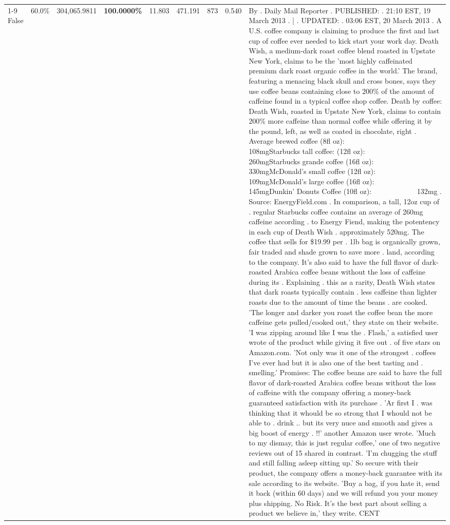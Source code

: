 \begin{table}[H]
{\begin{tabular}{lllrlllll}
\cline{1-9}
False & 60.0\% & 304,065.9811 & \bfseries \color{red} 100.0000\% & 11.803 & 471.191 & 873 & 0.540 & By . Daily Mail Reporter . PUBLISHED: . 21:10 EST, 19 March 2013 . | . UPDATED: . 03:06 EST, 20 March 2013 . A U.S. coffee company is claiming to produce the first and last cup of coffee ever needed to kick start your work day. Death Wish, a medium-dark roast coffee blend roasted in Upstate New York, claims to be the 'most highly caffeinated premium dark roast organic coffee in the world.' The brand, featuring a menacing black skull and cross bones, says they use coffee beans containing close to 200\% of the amount of caffeine found in a typical coffee shop coffee. Death by coffee: Death Wish, roasted in Upstate New York, claims to contain 200\% more caffeine than normal coffee while offering it by the pound, left, as well as coated in chocolate, right . Average brewed coffee (8fl oz):              108mgStarbucks tall coffee: (12fl oz):                260mgStarbucks grande coffee (16fl oz):         330mgMcDonald's small coffee (12fl oz):           109mgMcDonald's large coffee (16fl oz):           145mgDunkin' Donuts Coffee (10fl oz):             132mg . Source: EnergyField.com . In comparison, a tall, 12oz cup of . regular Starbucks coffee contains an average of 260mg caffeine according . to Energy Fiend, making the potentency in each cup of Death Wish . approximately 520mg. The coffee that sells for \$19.99 per . 1lb bag is organically grown, fair traded and shade grown to save more . land, according to the company. It's also said to have the full flavor of dark-roasted Arabica coffee beans without the loss of caffeine during its . Explaining . this as a rarity, Death Wish states that dark roasts typically contain . less caffeine than lighter roasts due to the amount of time the beans . are cooked. 'The longer and darker you roast the coffee bean the more caffeine gets pulled/cooked out,' they state on their website. 'I was zipping around like I was the . Flash,' a satisfied user wrote of the product while giving it five out . of five stars on Amazon.com. 'Not only was it one of the strongest . coffees I've ever had but it is also one of the best tasting and . smelling.’ Promises: The coffee beans are said to have the full flavor of dark-roasted Arabica coffee beans without the loss of caffeine with the company offering a money-back guaranteed satisfaction with its purchase . 'Ar first I . was thinking that it whould be so strong that I whould not be able to . drink .. but its very nuce and smooth and gives a big boost of energy . !!' another Amazon user wrote. 'Much to my dismay, this is just regular coffee,' one of two negative reviews out of 15 shared in contrast. 'I'm chugging the stuff and still falling asleep sitting up.' So secure with their product, the company offers a money-back guarantee with its sale according to its website. 'Buy a bag, if you hate it, send it back (within 60 days) and we will refund you your money plus shipping. No Risk. It’s the best part about selling a product we believe in,' they write. CENT \\

\end{tabular}}
\end{table}
